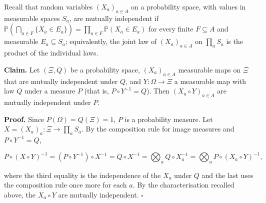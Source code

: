 \documentclass[11pt,a4paper]{article}
\begin{document}
Recall that random variables \((X_a)_{a\in A}\) on a probability space, with values in measurable spaces \(S_a\), are mutually independent if \(\mathbb P(\bigcap_{a\in F}\{X_a\in E_a\})=\prod_{a\in F}\mathbb P(X_a\in E_a)\) for every finite \(F\subseteq A\) and measurable \(E_a\subseteq S_a\); equivalently, the joint law of \((X_a)_{a\in A}\) on \(\prod_aS_a\) is the product of the individual laws.




\textbf{Claim.} Let \((\Xi,Q)\) be a probability space, \((X_a)_{a\in A}\) measurable maps on \(\Xi\) that are mutually independent under \(Q\), and \(Y:\Omega\to\Xi\) a measurable map with law \(Q\) under a measure \(P\) (that is, \(P\circ Y^{-1}=Q\)). Then \((X_a\circ Y)_{a\in A}\) are mutually independent under \(P\).




\textbf{Proof.} Since \(P(\Omega)=Q(\Xi)=1\), \(P\) is a probability measure. Let \(X=(X_a)_a:\Xi\to\prod_aS_a\). By the composition rule for image measures and \(P\circ Y^{-1}=Q\),


\[P\circ(X\circ Y)^{-1}=(P\circ Y^{-1})\circ X^{-1}=Q\circ X^{-1}=\bigotimes_a Q\circ X_a^{-1}=\bigotimes_a P\circ(X_a\circ Y)^{-1},\]


where the third equality is the independence of the \(X_a\) under \(Q\) and the last uses the composition rule once more for each \(a\). By the characterisation recalled above, the \(X_a\circ Y\) are mutually independent. \(\square\)
\end{document}
